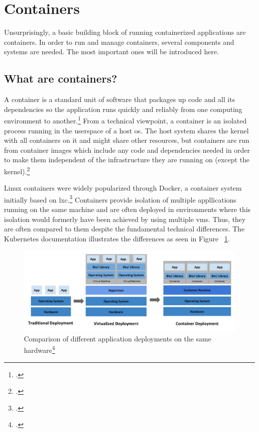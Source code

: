 \section{Containers}

Unsurprisingly, a basic building block of running containerized applications are containers.
In order to run and manage containers, several components and systems are needed. The most important ones will be introduced here.

\subsection{What are containers?}
A container is a standard unit of software that packages up code and all its dependencies so the application runs quickly and reliably from one computing environment to another.\footcite[][, section 'Package Software into Standardized Units for Development, Shipment and Deployment']{whatContainer}
From a technical viewpoint, a container is an isolated process running in the userspace of a host \gls{os}. The host system shares the kernel with all containers on it and might share other resources, but containers are run from container images which include any code and dependencies needed in order to make them independent of the infrastructure they are running on (except the kernel).\footcite[][, slide 13]{containerIntro}

Linux containers were widely popularized through Docker, a container system initially based on \gls{lxc}.\footcite[][, section '2013: Docker']{containerHistory}
Containers provide isolation of multiple appllications running on the same machine and are often deployed in environments where this isolation would formerly have been achieved by using multiple \gls{vm}s. Thus, they are often compared to them despite the fundamental technical differences. The Kubernetes documentation illustrates the differences as seen in Figure ~\ref{fig:VMsVsContainers}.

\begin{figure}[H]
\includegraphics[scale=0.3]{pictures/VMsVsContainers.jpg} 
\caption{Comparison of different application deployments on the same hardware\protect\footcite[][, section 'Going back in time']{k8sBasics}}
\label{fig:VMsVsContainers}
\end{figure}

